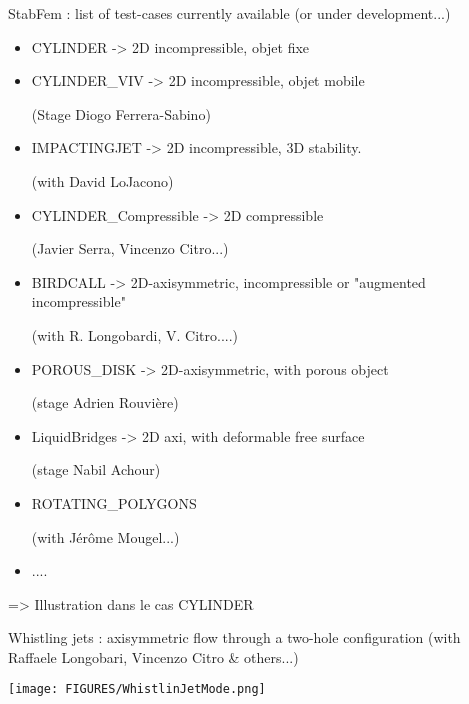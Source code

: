 \documentclass{beamer}
\begin{document}
\begin{frame}{StabFem : list of test-cases currently available (or under development...)}

\scriptsize

\begin{itemize}
\item CYLINDER  		\qquad -> 2D incompressible, objet fixe

\item CYLINDER\_VIV \qquad 	-> 2D incompressible, objet mobile 

(Stage Diogo Ferrera-Sabino)

\item IMPACTINGJET  		\qquad -> 2D incompressible, 3D stability.

(with David LoJacono)

\item CYLINDER\_Compressible  \qquad -> 2D compressible 

(Javier Serra, Vincenzo Citro...)

\item BIRDCALL \qquad -> 2D-axisymmetric, incompressible or "augmented incompressible"

(with R. Longobardi, V. Citro....)


\item POROUS\_DISK \qquad -> 2D-axisymmetric, with porous object 

(stage Adrien Rouvière)

\item LiquidBridges -> 2D axi, with deformable free surface

(stage Nabil Achour)

\item ROTATING\_POLYGONS

(with Jérôme Mougel...)
\item ....

\end{itemize}

=> Illustration dans le cas CYLINDER

\end{frame}


\begin{frame}{Whistling jets : axisymmetric flow through a two-hole configuration}
(with Raffaele Longobari, Vincenzo Citro \& others...)

\texttt{[image: FIGURES/WhistlinJetMode.png]}
\end{frame}
\end{document}
